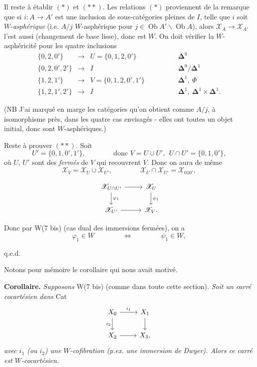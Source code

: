\documentclass[11pt]{article}
\newcommand{\printedpage}[1]{\marginpar{\footnotesize p.~#1}}
\newcommand{\msp}[1]{\marginpar{\footnotesize [#1]}}
\newcommand{\cX}{\mathscr{X}}
\newcommand{\Ob}{\operatorname{Ob}}
\begin{document}
Il reste à établir $(\ast)$ et $(\ast\ast)$. Les relations $(\ast)$ proviennent de la remarque que si $i : A \longrightarrow A'$ est une inclusion de sous-catégories pleines de $I$, telle que $i$ soit $W$-\textit{asphérique} (i.e. $A/j$ $W$-asphérique pour $j \in \Ob A'\backslash\Ob A$), alors $\cX_A \longrightarrow \cX_{A'}$ l'est aussi (changement de base lisse), donc est $W$. On doit vérifier la $W$-asphéricité pour les quatre inclusions
\[
\begin{array}{rcll}
\{0,2,0'\} & \longrightarrow & U = \{0,1,2,0'\} & \qquad\qquad \mathbf{\Delta}^0 \\[1ex]
\{0,2,0',2'\} & \longrightarrow & I & \qquad\qquad \mathbf{\Delta}^0/\mathbf{\Delta}^1 \\[1ex]
\{1,2,1'\} & \longrightarrow & V = \{0,1,2,0',1'\} & \qquad\qquad \mathbf{\Delta}^1,\ \Phi \\[1ex]
\{1,2,1',2'\} & \longrightarrow & I & \qquad\qquad \mathbf{\Delta}^1,\ \mathbf{\Delta}^1 \times \mathbf{\Delta}^1.
\end{array}
\]

\printedpage{154}

(NB J'ai marqué en marge les catégories qu'on obtient comme $A/j$, à isomorphisme près, dans les quatre cas envisagés - elles ont toutes un objet initial, donc sont $W$-asphériques.)

Reste à prouver $(\ast\ast)$. Soit
\[
U' = \{0,1,0',1'\}, \qquad\qquad \text{donc } V = U \cup U',\ \ U \cap U' = \{0,1,0'\},
\]
où $U$, $U'$ sont des \textit{fermés} de $V$ qui recouvrent $V$. Donc on aura de même
\[
\cX_V = \cX_U \cup \cX_{U'}, \qquad\qquad \cX_U \cap \cX_{U'} = \cX_{010'},
\]

\msp{page 239}

\[
\begin{tikzcd}
\cX_{U\cap U'} \arrow[r] \arrow[d, "\varphi_1"] & \cX_U \arrow[d, "\psi_1"] \\
\cX_{U'} \arrow[r] & \cX_V.
\end{tikzcd}
\]

Donc par W(7 bis) (cas dual des immersions fermées), on a
\[
\varphi_1 \in W \qquad\qquad \Longleftrightarrow \qquad\qquad \psi_1 \in W,
\]

\hfill q.e.d.

Notons pour mémoire le corollaire qui nous avait motivé.

\textbf{Corollaire.} \textit{Supposons} W(7 bis) (comme dans toute cette section). \textit{Soit un carré cocartésien dans} Cat
\[
\begin{tikzcd}
X_0 \arrow[r, "i_1"] \arrow[d, "i_2"'] & X_1 \arrow[d] \\
X_2 \arrow[r] & X_3,
\end{tikzcd}
\]
\textit{avec $i_1$ (ou $i_2$) une $W$-cofibration (p.ex. une immersion de Dwyer). Alors ce carré est $W$-cocartésien.}
\end{document}
